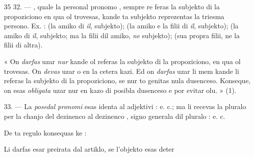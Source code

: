 \begin{VUpage}[39]{35}
32. --- , quale la personal pronomo , sempre re\cc
feras la subjekto di la propoziciono en qua ol trovesas,\nl
kande ta subjekto reprezentas la triesma persono. Ex. : \nl
{} (la amiko di \textit{il}, subjekto); \cc
{} (la amiko e la filii di \textit{il},\nl
subjekto);  (la amiko\nl
di \textit{il}, subjekto; ma la filii dil amiko, \textit{ne} subjekto); \nl
{} (sua propra filii, ne la filii di altra).

« On \textit{darfas} uzar  \textit{nur} kande ol referas la subjekto\nl
di la propoziciono, en qua ol trovesas. On \textit{devas} uzar  o\nl
{} en la cetera kazi. Ed on \textit{darfas} uzar li mem kande li\nl
referas la subjekto di la propoziciono, se nur to genitas nula\nl
dusenceso. Konseque, on esas \textit{obligata} uzar  nur en kazo\nl
di posibla dusenceso e por evitar olu. » (1).

\VUblanc{6.02pt}%
33. --- La \textit{posedal pronomi} esas identa al adjektivi :\nl
{} e. c.; ma li recevas la pluralo per la chanjo\nl
del dezinenco  al dezinenco , signo generala dil pluralo :\nl
{} e. c.

De ta regulo konsequas ke :

Li darfas esar preirata dal artiklo, se l'objekto esas deter\cc
\end{VUpage}

